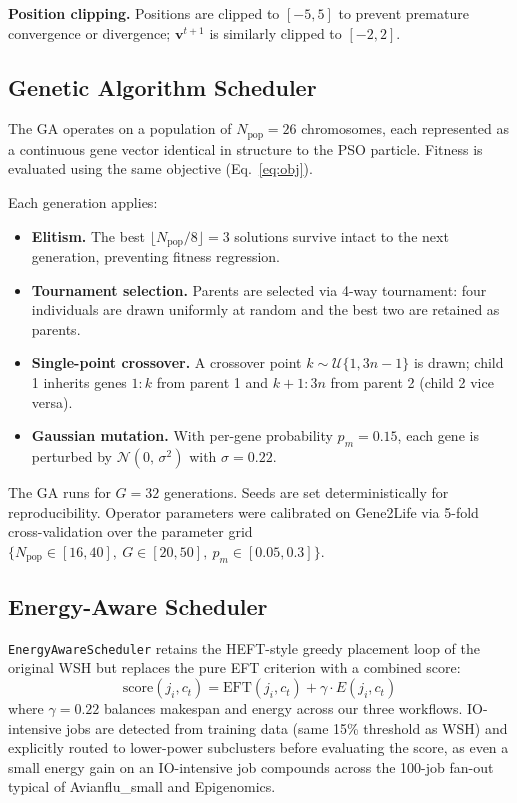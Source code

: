 \documentclass[10pt,twocolumn]{article}
\begin{document}
\textbf{Position clipping.}
Positions are clipped to $[-5, 5]$ to prevent premature convergence or divergence;
$\mathbf{v}^{t+1}$ is similarly clipped to $[-2, 2]$.

\subsection{Genetic Algorithm Scheduler}

The GA operates on a population of $N_{\text{pop}} = 26$ chromosomes, each
represented as a continuous gene vector identical in structure to the PSO particle.
Fitness is evaluated using the same objective (Eq.~\ref{eq:obj}).

Each generation applies:
\begin{itemize}[leftmargin=1.4cm,topsep=2pt,itemsep=1pt]
  \item \textbf{Elitism.} The best $\lfloor N_{\text{pop}}/8 \rfloor = 3$ solutions
        survive intact to the next generation, preventing fitness regression.
  \item \textbf{Tournament selection.} Parents are selected via 4-way tournament:
        four individuals are drawn uniformly at random and the best two are retained
        as parents.
  \item \textbf{Single-point crossover.} A crossover point $k \sim
        \mathcal{U}\{1, 3n-1\}$ is drawn; child 1 inherits genes $1\!:\!k$ from
        parent 1 and $k\!+\!1\!:\!3n$ from parent 2 (child 2 vice versa).
  \item \textbf{Gaussian mutation.} With per-gene probability $p_m = 0.15$, each
        gene is perturbed by $\mathcal{N}(0,\, \sigma^2)$ with $\sigma = 0.22$.
\end{itemize}

The GA runs for $G = 32$ generations. Seeds are set deterministically for
reproducibility. Operator parameters were calibrated on Gene2Life via 5-fold
cross-validation over the parameter grid $\{N_{\text{pop}} \in [16, 40],\
G \in [20, 50],\ p_m \in [0.05, 0.3]\}$.

\subsection{Energy-Aware Scheduler}

\texttt{EnergyAwareScheduler} retains the HEFT-style greedy placement loop of the
original WSH but replaces the pure EFT criterion with a combined score:
\begin{equation}
    \text{score}(j_i, c_t) = \text{EFT}(j_i, c_t) + \gamma \cdot E(j_i, c_t)
    \label{eq:energy_score}
\end{equation}
where $\gamma = 0.22$ balances makespan and energy across our three workflows.
IO-intensive jobs are detected from training data (same 15\% threshold as WSH) and
explicitly routed to lower-power subclusters before evaluating the score, as even a
small energy gain on an IO-intensive job compounds across the 100-job fan-out typical
of Avianflu\_small and Epigenomics.
\end{document}
